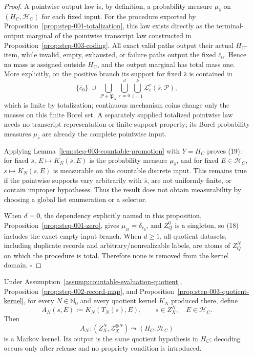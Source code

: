 \begin{proof}
A pointwise output law is, by definition, a probability measure
\(\mu_{\bar s}\) on \((H_C,\mathcal H_C)\) for each fixed input. For the
procedure exported by Proposition~\ref{prop:step-001-totalization}, this law exists directly as
the terminal-output marginal of the pointwise transcript law constructed in
Proposition~\ref{prop:step-003-coding}. All exact valid paths output
their actual \(H_C\)-item, while invalid, empty, exhausted, or failure paths
output the fixed \(\bar c_0\). Hence no mass is assigned outside \(H_C\),
and the output marginal has total mass one. More explicitly, on the
positive branch its support for fixed \(\bar s\) is contained in
\[
\{\bar c_0\}\ \cup\
\bigcup_{\mathcal P\in\mathfrak P_N}
\bigcup_{r=0}^{d}\bigcup_{i=1}^{k}
\mathcal L_i^r(\bar s,\mathcal P),
\tag{18a}
\]
which is finite by  totalization; continuous mechanism coins change
only the masses on this finite Borel set. A separately supplied totalized
pointwise law needs no transcript representation or finite-support
property; its Borel probability measures \(\mu_{\bar s}\) are already the
complete pointwise input.

Applying Lemma~\ref{lem:step-003-countable-promotion} with \(Y=H_C\) proves
(19): for fixed \(\bar s\), \(E\mapsto K_N(\bar s,E)\) is the probability
measure \(\mu_{\bar s}\), and for fixed \(E\in\mathcal H_C\),
\(\bar s\mapsto K_N(\bar s,E)\) is measurable on the countable discrete
input. This remains true if the pointwise supports vary arbitrarily with
\(\bar s\), are not uniformly finite, or contain improper hypotheses. Thus
the result does not obtain measurability by choosing a global list
enumeration or a selector.

When \(d=0\), the  dependency explicitly named in this proposition,
Proposition~\ref{prop:step-001-zero}, gives
\(\mu_{\varnothing}=\delta_{\bar c_0}\), and \(Z_Q^0\) is a singleton, so
(18) includes the exact empty-input branch. When \(d\ge1\), all quotient
datasets, including duplicate records and arbitrary/nonrealizable labels,
are atoms of \(Z_Q^N\) on which the  procedure is total. Therefore
none is removed from the kernel domain. \(\square\)


\end{proof}

\begin{proposition}\label{prop:step-003-raw-pullback}
Under Assumption~\ref{assump:countable-evaluation-quotient}, Proposition~\ref{prop:step-002-record-map}, and
Proposition~\ref{prop:step-003-quotient-kernel}, for every
\(N\in\mathbb N_0\) and every quotient kernel \(K_N\) produced there, define
\[
A_N(s,E):=K_N(T_N(s),E),
\qquad s\in Z_X^N,\quad E\in\mathcal H_C.
\tag{20}
\]
Then
\[
A_N:(Z_X^N,\mathcal Z_X^{\otimes N})
\leadsto(H_C,\mathcal H_C)
\tag{21}
\]
is a Markov kernel. Its output is the same quotient hypothesis in \(H_C\);
decoding occurs only after release and no propriety condition is introduced.


\end{proposition}

